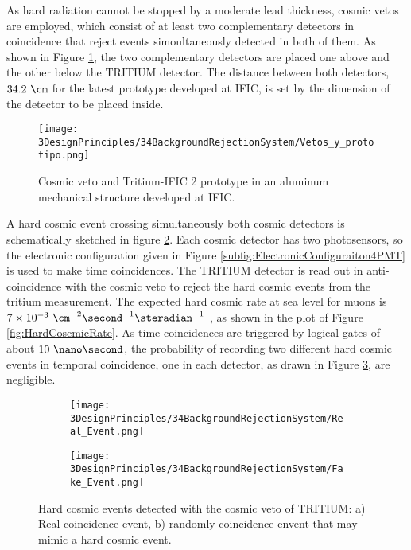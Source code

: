 As hard radiation cannot be stopped by a moderate lead thickness, cosmic vetos are employed, which consist of at least two complementary detectors in coincidence that reject events simoultaneously detected in both of them. As shown in Figure \ref{fig:VetoAndPrototype}, the two complementary detectors are placed one above and the other below the TRITIUM detector. The distance between both detectors, $34.2~\cm$ for the latest prototype developed at IFIC, is set by the dimension of the detector to be placed inside.

\begin{figure}[h]
\centering
\texttt{[image: 3DesignPrinciples/34BackgroundRejectionSystem/Vetos\_y\_prototipo.png]}
\caption{Cosmic veto and Tritium-IFIC 2 prototype in an aluminum mechanical structure developed at IFIC.\label{fig:VetoAndPrototype}}
\end{figure}

A hard cosmic event crossing simultaneously both cosmic detectors is schematically sketched in figure \ref{subfig:RealHardCosmicEvent}. Each cosmic detector has two photosensors, so the electronic configuration given in Figure \ref{subfig:ElectronicConfiguraiton4PMT} is used to make time coincidences. The TRITIUM detector is read out in anti-coincidence with the cosmic veto to reject the hard cosmic events from the tritium measurement. The expected hard cosmic rate at sea level for muons is $7\times 10^{-3}~\cm^{-2}\second^{-1}\steradian^{-1}$ \cite{PDG, HardCosmicMuonRate}, as shown in the plot of Figure \ref{fig:HardCoscmicRate}. As time coincidences are triggered by logical gates of about $10~\nano\second$, the probability of recording two different hard cosmic events in temporal coincidence, one in each detector, as drawn in Figure \ref{subfig:FakeHardCosmicEvent}, are negligible.

\begin{figure}[h]
\centering
    \begin{subfigure}[b]{0.45\textwidth}
    \centering
    \texttt{[image: 3DesignPrinciples/34BackgroundRejectionSystem/Real\_Event.png]}  
    \caption{\label{subfig:RealHardCosmicEvent}}
    \end{subfigure}
    \hfill
    \begin{subfigure}[b]{0.45\textwidth}
    \centering
    \texttt{[image: 3DesignPrinciples/34BackgroundRejectionSystem/Fake\_Event.png]}  
    \caption{\label{subfig:FakeHardCosmicEvent}}
    \end{subfigure}
   \caption{Hard cosmic events detected with the cosmic veto of TRITIUM: a) Real coincidence event, b) randomly coincidence envent that may mimic a hard cosmic event.}
 \label{fig:HardCosmicEventsSimulation}
\end{figure}

